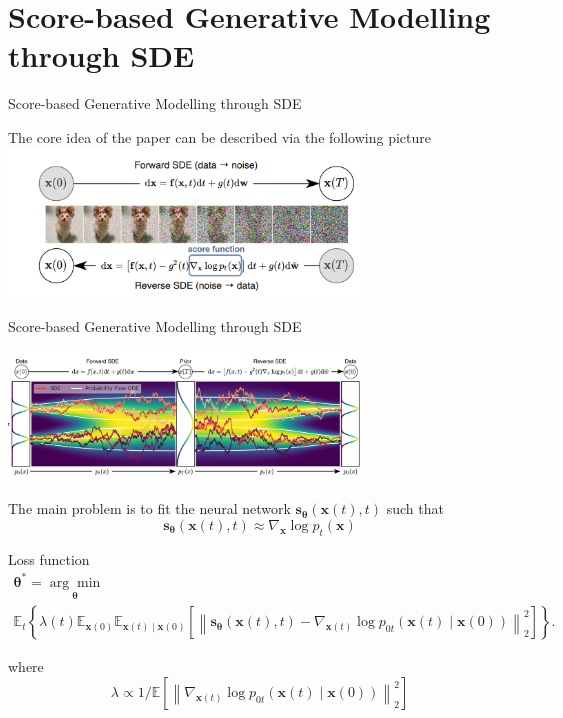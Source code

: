 \documentclass[xcolor=dvipsnames]{beamer}
\begin{document}
    \section{Score-based Generative Modelling through SDE} 
    \begin{frame}{Score-based Generative Modelling through SDE}
        \begin{center}
            The core idea of the paper can be described via the following picture
            \includegraphics[width=0.7\textwidth]{pics/NoiseDenoise.png}
        \end{center}
    \end{frame}

    \begin{frame}{Score-based Generative Modelling through SDE}
        \begin{center}
            \includegraphics[width=0.7\textwidth]{pics/NoiseDenoise2.png}
        \end{center}
        The main problem is to fit the neural network $\mathbf{s}_{\boldsymbol{\theta}}(\mathbf{x}(t), t)$ such that 
        $$
        \mathbf{s}_{\boldsymbol{\theta}}(\mathbf{x}(t), t) \approx \nabla_{\mathbf{x}} \log p_t(\mathbf{x})
        $$
    \end{frame}

    \begin{frame}{Loss function}
        \begin{multline*}
            \boldsymbol{\theta}^*=\underset{\boldsymbol{\theta}}{\arg \min } \\ \mathbb{E}_t\left\{ 
            \lambda(t) \mathbb{E}_{\mathbf{x}(0)} \mathbb{E}_{\mathbf{x}(t) \mid \mathbf{x}(0)}\left[\left\|\mathbf{s}_{\boldsymbol{\theta}}(\mathbf{x}(t), t)-\nabla_{\mathbf{x}(t)} \log p_{0 t}(\mathbf{x}(t) \mid \mathbf{x}(0))\right\|_2^2\right]\right\} .
        \end{multline*}
        
        where 
        $$
        \lambda \propto 1 / \mathbb{E}\left[\left\|\nabla_{\mathbf{x}(t)} \log p_{0 t}(\mathbf{x}(t) \mid \mathbf{x}(0))\right\|_2^2\right]
        $$
    \end{frame}
\end{document}
